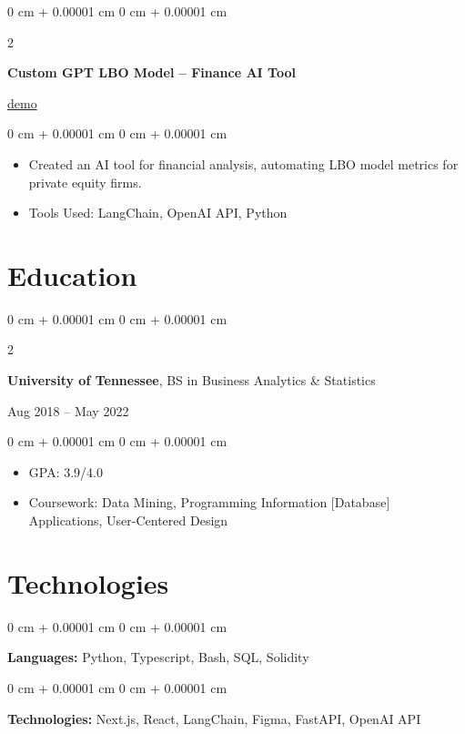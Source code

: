\documentclass[10pt, letterpaper]{article}
\newenvironment{highlights}{
    \begin{itemize}[
        topsep=0.10 cm,
        parsep=0.10 cm,
        partopsep=0pt,
        itemsep=0pt,
        leftmargin=0 cm + 10pt
    ]
}{
    \end{itemize}
} %
\newenvironment{onecolentry}{
    \begin{adjustwidth}{
        0 cm + 0.00001 cm
    }{
        0 cm + 0.00001 cm
    }
}{
    \end{adjustwidth}
} %
\newenvironment{twocolentry}[2][]{
    \onecolentry
    \def\secondColumn{#2}
    \setcolumnwidth{\fill, 4.5 cm}
    \begin{paracol}{2}
}{
    \switchcolumn \raggedleft \secondColumn
    \end{paracol}
    \endonecolentry
} %
\begin{document}
\begin{twocolentry}{\href{https://github.com/privategpt}{demo}}
    \textbf{Custom GPT LBO Model – Finance AI Tool}
\end{twocolentry}
\vspace{0.10 cm}
\begin{onecolentry}
\begin{highlights}
    \item Created an AI tool for financial analysis, automating LBO model metrics for private equity firms.
    \item Tools Used: LangChain, OpenAI API, Python
\end{highlights}
\end{onecolentry}



\section{Education}

\begin{twocolentry}{Aug 2018 – May 2022}
    \textbf{University of Tennessee}, BS in Business Analytics \& Statistics
\end{twocolentry}

\vspace{0.10 cm}

\begin{onecolentry}
\begin{highlights}
    \item GPA: 3.9/4.0
    \item Coursework: Data Mining, Programming Information [Database] Applications, User-Centered Design
\end{highlights}
\end{onecolentry}



\section{Technologies}

\begin{onecolentry}
    \textbf{Languages:} Python, Typescript, Bash, SQL, Solidity
\end{onecolentry}

\vspace{0.2 cm}

\begin{onecolentry}
    \textbf{Technologies:} Next.js, React, LangChain, Figma, FastAPI, OpenAI API
\end{onecolentry}
\end{document}
